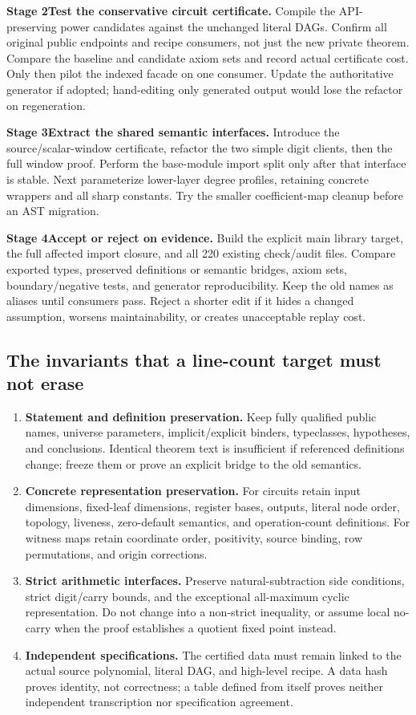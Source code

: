 \textbf{Stage 2\quad Test the conservative circuit certificate.}
Compile the API-preserving power candidates against the unchanged literal
DAGs. Confirm all original public endpoints and recipe consumers, not just
the new private theorem. Compare the baseline and candidate axiom sets and
record actual certificate cost. Only then pilot the indexed facade on one
consumer. Update the authoritative generator if adopted; hand-editing only
generated output would lose the refactor on regeneration.

\textbf{Stage 3\quad Extract the shared semantic interfaces.}
Introduce the source/scalar-window certificate, refactor the two simple
digit clients, then the full window proof. Perform the base-module import
split only after that interface is stable. Next parameterize lower-layer
degree profiles, retaining concrete wrappers and all sharp constants.
Try the smaller coefficient-map cleanup before an AST migration.

\textbf{Stage 4\quad Accept or reject on evidence.}
Build the explicit main library target, the full affected import closure,
and all 220 existing check/audit files. Compare exported types, preserved
definitions or semantic bridges, axiom sets, boundary/negative tests, and
generator reproducibility. Keep the old names as aliases until consumers
pass. Reject a shorter edit if it hides a changed assumption, worsens
maintainability, or creates unacceptable replay cost.

\subsection{The invariants that a line-count target must not erase}

\begin{enumerate}
\item \textbf{Statement and definition preservation.}
Keep fully qualified public names, universe parameters, implicit/explicit
binders, typeclasses, hypotheses, and conclusions. Identical theorem text
is insufficient if referenced definitions change; freeze them or prove an
explicit bridge to the old semantics.
\item \textbf{Concrete representation preservation.}
For circuits retain input dimensions, fixed-leaf dimensions, register bases,
outputs, literal node order, topology, liveness, zero-default semantics,
and operation-count definitions. For witness maps retain coordinate order,
positivity, source binding, row permutations, and origin corrections.
\item \textbf{Strict arithmetic interfaces.}
Preserve natural-subtraction side conditions, strict digit/carry bounds,
and the exceptional all-maximum cyclic representation. Do not change
 into a non-strict inequality, or assume local
no-carry when the proof establishes a quotient fixed point instead.
\item \textbf{Independent specifications.}
The certified data must remain linked to the actual source polynomial,
literal DAG, and high-level recipe. A data hash proves identity, not
correctness; a table defined from itself proves neither independent
transcription nor specification agreement.
\end{enumerate}

